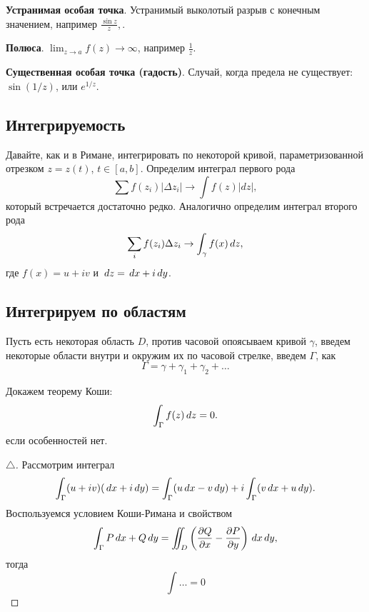 \textbf{Устранимая особая точка}. Устранимый выколотый разрыв с конечным значением, например $\frac{\sin z}{z},$.


\textbf{Полюса}. $\lim_{z \to a} f(z) \to \infty$, например $\frac{1}{z}$. 


\textbf{Существенная особая точка (гадость)}. Случай, когда предела не существует: $\sin(1/z)$, или $e^{1/z}$.


\subsection*{Интегрируемость}


Давайте, как и в Римане, интегрировать по некоторой кривой, параметризованной отрезком $z = z(t)$, $t \in [a, b]$. Определим интеграл первого рода
\begin{equation*}
    \sum f(z_i) |\Delta z_i | \to \int f(z) |d z|,
\end{equation*}
который встречается достаточно редко. Аналогично определим интеграл второго рода
\begin{equation*}
    \sum_i f(z_i) \Delta z_i \to \int_\gamma f(x) \, d z,
\end{equation*}
где $f(x) = u + i v$ и $\, d z = \, d x + i \, d y$. 



\subsection*{Интегрируем по областям}

Пусть есть некоторая область $D$, против часовой опоясываем кривой $\gamma$, введем некоторые области внутри и окружим их по часовой стрелке, введем $\Gamma$, как
\begin{equation*}
    \Gamma = \gamma + \gamma_1 + \gamma_2 + \ldots
\end{equation*}

Докажем теорему Коши:
\begin{equation*}
    \int_\Gamma f(z) \, d z = 0.
\end{equation*}
если особенностей нет. 

\begin{proof}[$\triangle$]
Рассмотрим интеграл
\begin{equation*}
    \int_\Gamma (u + i v) (\, d x + i \, d y) = \int_\Gamma (u \, d x - v \, d y) + 
    i \int_\Gamma (v \, d x + u \, d y).
\end{equation*}
Воспользуемся условием Коши-Римана и свойством
\begin{equation*}
    \int_\Gamma P \, d x + Q \, d y = \iint_D \left(\frac{\partial Q}{\partial x} - \frac{\partial P}{\partial y} \right) \, d x \, d y,
\end{equation*}
тогда
\begin{equation*}
    \int \ldots = 0
\end{equation*}
\end{proof}


